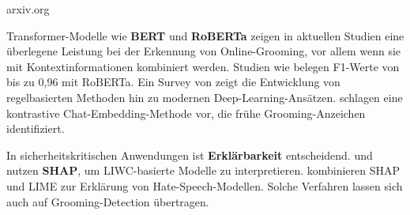 


arxiv.org

Transformer-Modelle wie \textbf{BERT} und \textbf{RoBERTa} zeigen in aktuellen Studien eine überlegene Leistung bei der Erkennung von Online-Grooming, vor allem wenn sie mit Kontextinformationen kombiniert werden. Studien wie \parencite{street2024grooming} belegen F1-Werte von bis zu 0{,}96 mit RoBERTa. Ein Survey von \parencite{rezaee2022survey} zeigt die Entwicklung von regelbasierten Methoden hin zu modernen Deep-Learning-Ansätzen. \parencite{borj2023contrastive} schlagen eine kontrastive Chat-Embedding-Methode vor, die frühe Grooming-Anzeichen identifiziert.

In sicherheitskritischen Anwendungen ist \textbf{Erklärbarkeit} entscheidend. \parencite{mehta2021liwcbert} und \parencite{mbaziira2023shap} nutzen \textbf{SHAP}, um LIWC-basierte Modelle zu interpretieren. \parencite{shahzad2024hateinsights} kombinieren SHAP und LIME zur Erklärung von Hate-Speech-Modellen. Solche Verfahren lassen sich auch auf Grooming-Detection übertragen.

